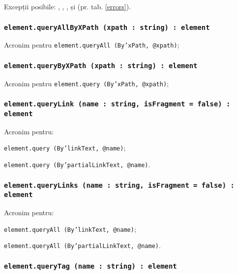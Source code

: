Excepții posibile: , , ,  și  (pr. tab. \ref{errors}).

\subsubsection{\texttt{element.queryAllByXPath (xpath : string) : element}}

Acronim pentru \texttt{element.queryAll (By'xPath, @xpath)};

\subsubsection{\texttt{element.queryByXPath (xpath : string) : element}}

Acronim pentru \texttt{element.query (By'xPath, @xpath)};

\subsubsection{\texttt{element.queryLink (name : string, isFragment = false) : element}}

Acronim pentru:
\begin{icItems}
	\item \texttt{element.query (By'linkText, @name)};
	\item \texttt{element.query (By'partialLinkText, @name)}.
\end{icItems}

\subsubsection{\texttt{element.queryLinks (name : string, isFragment = false) : element}}

Acronim pentru:
\begin{icItems}
	\item \texttt{element.queryAll (By'linkText, @name)};
	\item \texttt{element.queryAll (By'partialLinkText, @name)}.
\end{icItems}

\subsubsection{\texttt{element.queryTag (name : string) : element}}

